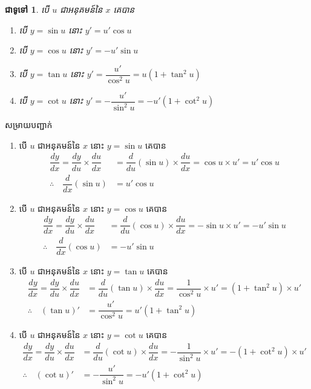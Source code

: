 \documentclass[12pt,fleqn]{book} %
\newtheorem{general}{\kml ជាទូទៅ}
\newcommand{\solution}{{\begin{center}\kml \color{magenta} សម្រាយបញ្ជាក់\end{center} }}
\begin{document}
\begin{general}
បើ $u$ ជាអនុគមន៍នៃ $x$ គេបាន 
\begin{enumerate}
\item បើ $y=\sin u$ នោះ $y'=u'\cos u$ 
\item បើ $y=\cos u$ នោះ $y'=-u'\sin u$  
\item បើ $y=\tan u$ នោះ $y'=\dfrac{u'}{\cos^2 u}=u(1+\tan^2 u)$
\item បើ $y=\cot u$ នោះ $y'=-\dfrac{u'}{\sin^2 u}=-u'(1+\cot^2 u)$
\end{enumerate}

\end{general}
\solution 
\begin{enumerate}

\item បើ $u$ ជាអនុគមន៍នៃ $x$ នោះ $y=\sin u$ គេបាន 
\begin{align*}
\dfrac{dy}{dx}=\dfrac{dy}{du}\times \dfrac{du}{dx}&=\dfrac{d}{du}(\sin u)\times \dfrac{du}{dx}=\cos u \times u'=u'\cos u\\
\therefore \quad \dfrac{d}{dx}(\sin u)&=u'\cos u
\end{align*}
\item បើ $u$ ជាអនុគមន៍នៃ $x$ នោះ $y=\cos u$ គេបាន 
\begin{align*}
\dfrac{dy}{dx}=\dfrac{dy}{du}\times \dfrac{du}{dx}&=\dfrac{d}{du}(\cos u)\times \dfrac{du}{dx}=-\sin u \times u'=-u'\sin u\\
\therefore \quad \dfrac{d}{dx}(\cos u)&=-u'\sin u
\end{align*}
\item បើ $u$ ជាអនុគមន៍នៃ $x$ នោះ $y=\tan u$ គេបាន 
\begin{align*}
\dfrac{dy}{dx}=\dfrac{dy}{du}\times \dfrac{du}{dx}&=\dfrac{d}{du}(\tan u)\times \dfrac{du}{dx}=\dfrac{1}{\cos^2 u} \times u'=(1+\tan^2 u)\times u'\\
\therefore \quad (\tan u)'&=\dfrac{u'}{\cos^2 u}=u'(1+\tan^2 u)
\end{align*}
\item បើ $u$ ជាអនុគមន៍នៃ $x$ នោះ $y=\cot u$ គេបាន 
\begin{align*}
\dfrac{dy}{dx}=\dfrac{dy}{du}\times \dfrac{du}{dx}&=\dfrac{d}{du}(\cot u)\times \dfrac{du}{dx}=-\dfrac{1}{\sin^2 u} \times u'=-(1+\cot^2 u)\times u'\\
\therefore \quad (\cot u)'&=-\dfrac{u'}{\sin ^2 u}=-u'(1+\cot^2 u)
\end{align*}
\end{enumerate}
\end{document}
